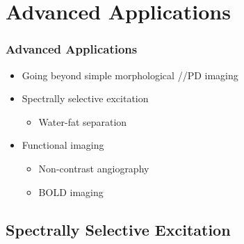 



\section{Advanced Applications} %
\label{sec:advanced_applications}

\begin{frame}
	\frametitle{Advanced Applications}
	
	\begin{itemize}
		\item Going beyond simple morphological \longtime{}/\transtime{}/PD imaging
		\item Spectrally selective excitation
		\begin{itemize}
			\item Water-fat separation
		\end{itemize}
		\item Functional imaging
		\begin{itemize}
			\item Non-contrast angiography
			\item BOLD imaging
		\end{itemize}
	\end{itemize}
\end{frame}



\subsection{Spectrally Selective Excitation} %
\label{sub:spectrally_selective_excitation}

	
	
